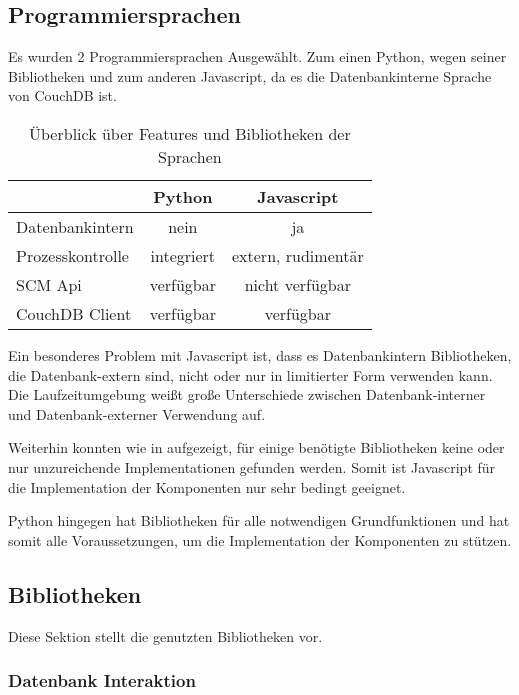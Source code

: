  
\subsection{Programmiersprachen}

Es wurden 2 Programmiersprachen Ausgew\"ahlt.
Zum einen Python, wegen seiner Bibliotheken und
zum anderen Javascript, da es die Datenbankinterne Sprache von CouchDB ist.

\begin{table}[ht]
\centering
\begin{tabular}{l|c|c}
                            & \textbf{Python} & \textbf{Javascript} \\
    \hline
    Datenbankintern         & nein            & ja \\
    Prozesskontrolle        & integriert      & extern, rudimentär \\
    SCM Api                 & verfügbar       & nicht verfügbar \\
    CouchDB Client          & verfügbar       & verfügbar \\
\end{tabular}
\caption{Überblick über Features und Bibliotheken der Sprachen}
\label{tab:python-vs-js}
\end{table}

Ein besonderes Problem mit Javascript ist,
dass es Datenbankintern Bibliotheken, die Datenbank-extern sind,
nicht oder nur in limitierter Form verwenden kann.
Die Laufzeitumgebung weißt große Unterschiede
zwischen Datenbank-interner und Datenbank-externer Verwendung auf.

Weiterhin konnten wie in  aufgezeigt,
für einige benötigte Bibliotheken keine
oder nur unzureichende Implementationen gefunden werden.
Somit ist Javascript für die Implementation der Komponenten
nur sehr bedingt geeignet.

Python hingegen hat Bibliotheken für alle notwendigen Grundfunktionen
und hat somit alle Voraussetzungen,
um die Implementation der Komponenten zu stützen.

\subsection{Bibliotheken}

Diese Sektion stellt die genutzten Bibliotheken vor.

\subsubsection{Datenbank Interaktion}

